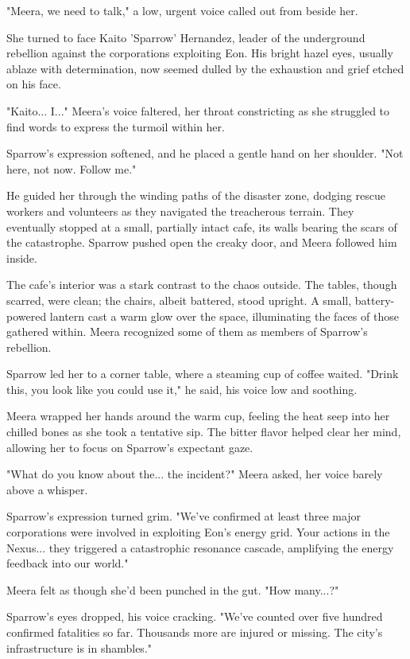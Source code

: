 \documentclass[12pt]{book}
\begin{document}
"Meera, we need to talk," a low, urgent voice called out from beside
her.

She turned to face Kaito 'Sparrow' Hernandez, leader of the underground
rebellion against the corporations exploiting Eon. His bright hazel
eyes, usually ablaze with determination, now seemed dulled by the
exhaustion and grief etched on his face.

"Kaito... I..." Meera's voice faltered, her throat constricting as she
struggled to find words to express the turmoil within her.

Sparrow's expression softened, and he placed a gentle hand on her
shoulder. "Not here, not now. Follow me."

He guided her through the winding paths of the disaster zone, dodging
rescue workers and volunteers as they navigated the treacherous terrain.
They eventually stopped at a small, partially intact cafe, its walls
bearing the scars of the catastrophe. Sparrow pushed open the creaky
door, and Meera followed him inside.

The cafe's interior was a stark contrast to the chaos outside. The
tables, though scarred, were clean; the chairs, albeit battered, stood
upright. A small, battery-powered lantern cast a warm glow over the
space, illuminating the faces of those gathered within. Meera recognized
some of them as members of Sparrow's rebellion.

Sparrow led her to a corner table, where a steaming cup of coffee
waited. "Drink this, you look like you could use it," he said, his voice
low and soothing.

Meera wrapped her hands around the warm cup, feeling the heat seep into
her chilled bones as she took a tentative sip. The bitter flavor helped
clear her mind, allowing her to focus on Sparrow's expectant gaze.

"What do you know about the... the incident?" Meera asked, her voice
barely above a whisper.

Sparrow's expression turned grim. "We've confirmed at least three major
corporations were involved in exploiting Eon's energy grid. Your actions
in the Nexus... they triggered a catastrophic resonance cascade,
amplifying the energy feedback into our world."

Meera felt as though she'd been punched in the gut. "How many...?"

Sparrow's eyes dropped, his voice cracking. "We've counted over five
hundred confirmed fatalities so far. Thousands more are injured or
missing. The city's infrastructure is in shambles."
\end{document}
